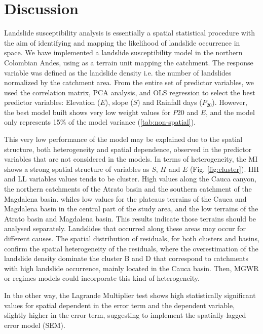 \documentclass[
  manuscript=article,  
  layout=preprint,  
  year=2023,
  volume=0,
]{format}
\begin{document}
\section{Discussion}
\par Landslide susceptibility analysis is essentially a spatial statistical procedure with the aim of identifying and mapping the likelihood of landslide occurrence in space. We have implemented a landslide susceptibility model in the northern Colombian Andes, using as a terrain unit mapping the catchment. The response variable was defined as the landslide density i.e. the number of landslides normalized by the catchment area. From the entire set of predictor variables, we used the correlation matrix, PCA analysis, and OLS regression to select the best predictor variables: Elevation ($E$), slope ($S$) and Rainfall days ($P_{20}$). However, the best model built shows very low weight values for $P{20}$ and $E$, and the model only represents 15\% of the model variance (\ref{tab:non-spatial}). 

\par This very low performance of the model may be explained due to the spatial structure, both heterogeneity and spatial dependence, observed in the predictor variables that are not considered in the models. In terms of heterogeneity, the MI shows a strong spatial structure of variables as $S$, $H$ and $E$ (Fig. \ref{fig:cluster}). HH and LL variables values tends to be cluster. High values along the Cauca canyon, the northern catchments of the Atrato basin and the southern catchment of the Magdalena basin. whiles low values for the plateaus terrains of the Cauca and Magdalena basin in the central part of the study area, and the low terrains of the Atrato basin and Magdalena basin. This results indicate those terrains should be analysed separately. Landslides that occurred along these areas may occur for different causes. The spatial distribution of residuals, for both clusters and basins, confirm the spatial heterogeneity of the residuals, where the overestimation of the landslide density dominate the cluster B and D that correspond to catchments with high landslide occurrence, mainly located in the Cauca basin. Then, MGWR or regimes models could incorporate this kind of heterogeneity.

In the other way, the Lagrande Multiplier test shows high statistically significant values for spatial dependent in the error term and the dependent variable, slightly higher in the error term, suggesting to implement the spatially-lagged error model (SEM). 
\end{document}
